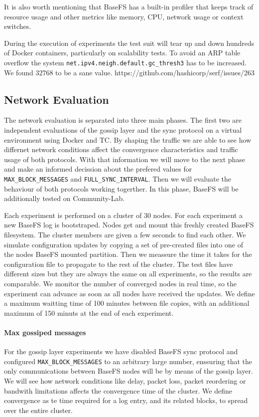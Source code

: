 \documentclass{sig-alternate}
\begin{document}
It is also worth mentioning that BaseFS has a built-in profiler that keeps track of resource usage and other metrics like memory, CPU, network usage or context switches.

During the execution of experiments the test suit will tear up and down hundreds of Docker containers, particularly on scalability tests. To avoid an ARP table overflow the system \texttt{net.ipv4.neigh.default.gc\_thresh3} has to be increased. We found 32768 to be a sane value. https://github.com/hashicorp/serf/issues/263

\subsection{Network Evaluation}
The network evaluation is separated into three main phases. The first two are independent evaluations of the gossip layer and the sync protocol on a virtual environment using Docker and TC. By shaping the traffic we are able to see how differnet network conditions affect the convergence characteristics and traffic usage of both protocols. With that information we will move to the next phase and make an informed decission about the prefered values for \texttt{MAX\_BLOCK\_MESSAGES} and \texttt{FULL\_SYNC\_INTERVAL}. Then we will evaluate the behaviour of both protocols working togerther. In this phase, BaseFS will be additionally tested on Community-Lab.

Each experiment is performed on a cluster of 30 nodes. For each experiment a new BaseFS log is bootstraped. Nodes get and mount this freshly created BaseFS filesystem. The cluster members are given a few seconds to find each other. We simulate configuration updates by copying a set of pre-created files into one of the nodes BaseFS mounted partition. Then we meassure the time it takes for the configuration file to propagate to the rest of the cluster. The test files have different sizes but they are always the same on all experiments, so the results are comparable. We monitor the number of converged nodes in real time, so the experiment can advance as soon as all nodes have received the updates. We define a maximum waitting time of 100 minutes between file copies, with an additional maximum of 150 minuts at the end of each experiment.


\paragraph{Max gossiped messages}

For the gossip layer experiments we have disabled BaseFS sync protocol and configured \texttt{MAX\_BLOCK\_MESSAGES} to an arbitrary large number, enssuring that the only communications between BaseFS nodes will be by means of the gossip layer. We will see how network conditions like delay, packet loss, packet reordering or bandwith limitations affects the convergence time of the cluster. We define convergence as te time required for a log entry, and its related blocks, to spread over the entire cluster.
\end{document}
